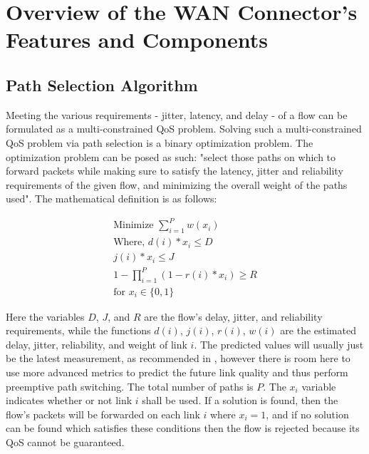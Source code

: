 \section{Overview of the WAN Connector's Features and Components}
\label{sec:approach:arch}

\subsection{Path Selection Algorithm}

Meeting the various requirements - jitter, latency, and delay - of a flow can be formulated as a multi-constrained QoS problem. Solving such a multi-constrained QoS problem via path selection is a binary optimization problem. The optimization problem can be posed as such: "select those paths on which to forward packets while making sure to satisfy the latency, jitter and reliability requirements of the given flow, and minimizing the overall weight of the paths used". The mathematical definition is as follows:

\begin{gather}
\text{Minimize } \sum_{i=1}^{P}w(x_i) \\
\text{Where,   } d(i) * x_i\le D \\
j(i) * x_i \le J \\
1 - \prod_{i=1}^{P}{ ( 1- r(i) * x_i ) } \ge R  \\
\text{for } x_i \in \{0,1\}
\end{gather}

Here the variables $D$, $J$, and $R$ are the flow's delay, jitter, and reliability requirements, while the functions $d(i)$, $j(i)$, $r(i)$, $w(i)$ are the estimated delay, jitter, reliability, and weight of link $i$. The predicted values will usually just be the latest measurement, as recommended in \cite{akella2008performance}, however there is room here to use more advanced metrics to predict the future link quality and thus perform preemptive path switching. The total number of paths is $P$. The $x_i$ variable indicates whether or not link $i$ shall be used. If a solution is found, then the flow's packets will be forwarded on each link $i$ where $x_i = 1$, and if no solution can be found which satisfies these conditions then the flow is rejected because its QoS cannot be guaranteed.

